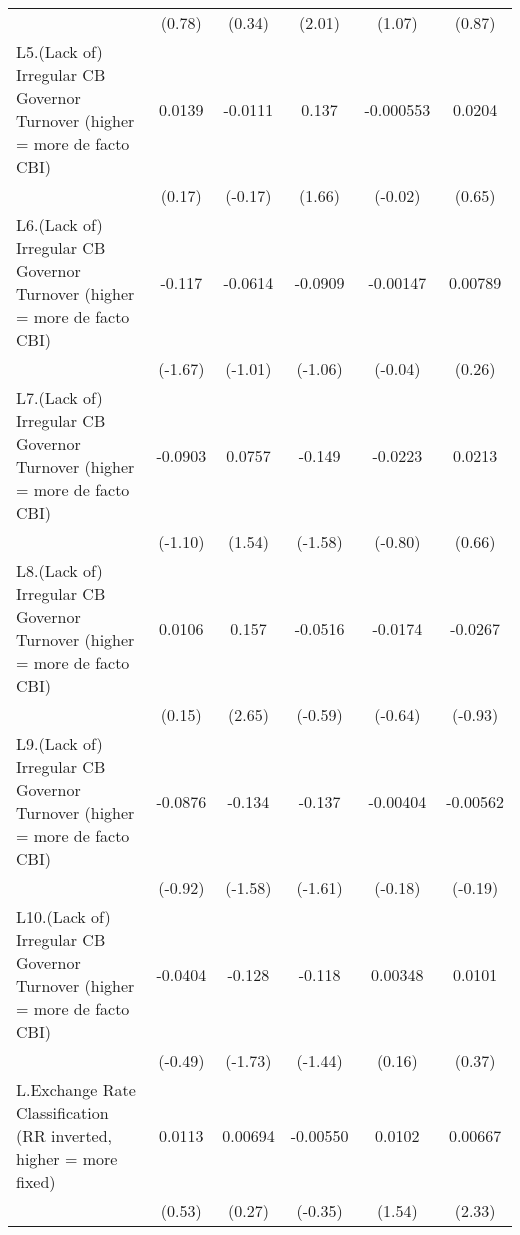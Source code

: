 {\begin{longtable}{l*{5}{c}}
                &   (0.78)         &   (0.34)         &   (2.01)         &   (1.07)         &   (0.87)         \\
[1em]
L5.(Lack of) Irregular CB Governor Turnover (higher = more de facto CBI)&   0.0139         &  -0.0111         &    0.137         &-0.000553         &   0.0204         \\
                &   (0.17)         &  (-0.17)         &   (1.66)         &  (-0.02)         &   (0.65)         \\
[1em]
L6.(Lack of) Irregular CB Governor Turnover (higher = more de facto CBI)&   -0.117         &  -0.0614         &  -0.0909         & -0.00147         &  0.00789         \\
                &  (-1.67)         &  (-1.01)         &  (-1.06)         &  (-0.04)         &   (0.26)         \\
[1em]
L7.(Lack of) Irregular CB Governor Turnover (higher = more de facto CBI)&  -0.0903         &   0.0757         &   -0.149         &  -0.0223         &   0.0213         \\
                &  (-1.10)         &   (1.54)         &  (-1.58)         &  (-0.80)         &   (0.66)         \\
[1em]
L8.(Lack of) Irregular CB Governor Turnover (higher = more de facto CBI)&   0.0106         &    0.157\sym{**} &  -0.0516         &  -0.0174         &  -0.0267         \\
                &   (0.15)         &   (2.65)         &  (-0.59)         &  (-0.64)         &  (-0.93)         \\
[1em]
L9.(Lack of) Irregular CB Governor Turnover (higher = more de facto CBI)&  -0.0876         &   -0.134         &   -0.137         & -0.00404         & -0.00562         \\
                &  (-0.92)         &  (-1.58)         &  (-1.61)         &  (-0.18)         &  (-0.19)         \\
[1em]
L10.(Lack of) Irregular CB Governor Turnover (higher = more de facto CBI)&  -0.0404         &   -0.128         &   -0.118         &  0.00348         &   0.0101         \\
                &  (-0.49)         &  (-1.73)         &  (-1.44)         &   (0.16)         &   (0.37)         \\
[1em]
L.Exchange Rate Classification (RR inverted, higher = more fixed)&   0.0113         &  0.00694         & -0.00550         &   0.0102         &  0.00667\sym{*}  \\
                &   (0.53)         &   (0.27)         &  (-0.35)         &   (1.54)         &   (2.33)         \\

\end{longtable}}
